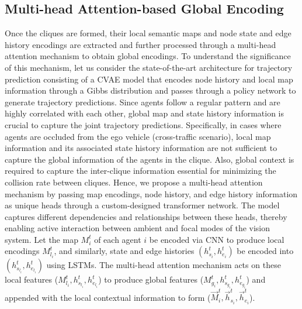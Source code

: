 \documentclass[letterpaper, 10 pt, conference]{ieeeconf}  %
\begin{document}
\subsection{Multi-head Attention-based Global Encoding}
Once the cliques are formed, their local semantic maps and node state and edge history encodings are extracted and further processed through a multi-head attention mechanism to obtain global encodings. To understand the significance of this mechanism, let us consider the state-of-the-art architecture for trajectory prediction consisting of a CVAE model that encodes node history and local map information through a Gibbs distribution and passes through a policy network to generate trajectory predictions. Since agents follow a regular pattern and are highly correlated with each other, global map and state history information is crucial to capture the joint trajectory predictions. Specifically, in cases where agents are occluded from the ego vehicle (cross-traffic scenario), local map information and its associated state history information are not sufficient to capture the global information of the agents in the clique. Also, global context is required to capture the inter-clique information essential for minimizing the collision rate between cliques. Hence, we propose a multi-head attention mechanism by passing map encodings, node history, and edge history information as unique heads through a custom-designed transformer network. The model captures different dependencies and relationships between these heads, thereby enabling active interaction between ambient and focal modes of the vision system. Let the map $M^t_i$ of each agent $i$ be encoded via CNN to produce local encodings $M_{l_i}^t$, and similarly, state and edge histories $(h_{s_i}^t, h_{e_i}^t)$ be encoded into $(h_{s_{l_i}}^t, h_{e_{l_i}}^t )$ using LSTMs. The multi-head attention mechanism acts on these local features ($M_{l_i}^t,h_{s_{l_i}}^t, h_{e_{l_i}}^t $) to produce global features  ($M_{g_i}^t, h_{s_{g_i}}^t, h_{e_{g_i}}^t $) and appended with the local contextual information to form ($\vec M^t_i, \vec h_{s_i}^t, \vec h_{e_i}^t $).  
\end{document}
